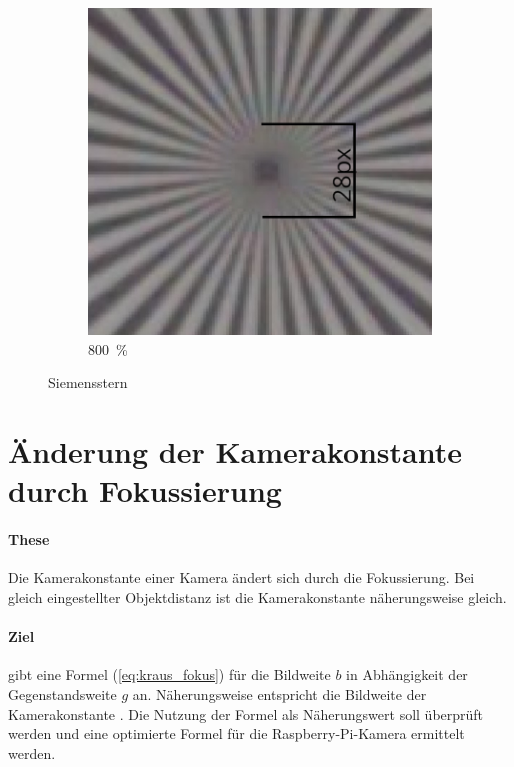 \documentclass[./00PhotoBox.tex]{subfiles}
\begin{document}
\begin{figure}
\begin{subfigure}{0.45\textwidth}
        \includegraphics[height=0.9\linewidth]{./img/4_voruntersuchung/siemens_beschriftet.jpg}
        \centering
        \caption{\SI{800}{\percent}}
        \label{img:siemens_beschriftet}
    \end{subfigure}
    \caption{Siemensstern}
\end{figure}


\section{Änderung der Kamerakonstante durch Fokussierung}
\label{sec:fokus}

\paragraph{These}
Die \Gls{Kamerakonstante} einer Kamera ändert sich durch die Fokussierung. Bei gleich eingestellter Objektdistanz ist die \Gls{Kamerakonstante} näherungsweise gleich.

\paragraph{Ziel}
\citet[S. 59]{kraus}  gibt eine Formel (\autoref{eq:kraus_fokus}) für die \Gls{Bildweite} $b$ in Abhängigkeit der Gegenstandsweite $g$ an. Näherungsweise entspricht die \Gls{Bildweite} der \Gls{Kamerakonstante} \citep[vgl.][S. 59]{kraus}. Die Nutzung der Formel als Näherungswert soll überprüft werden und eine optimierte Formel für die Raspberry-Pi-Kamera ermittelt werden.
\end{document}

